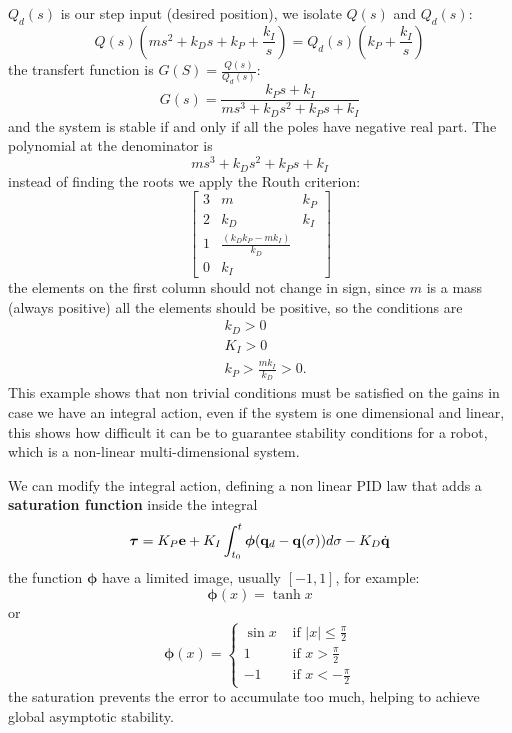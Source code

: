 \documentclass[10pt, a4paper]{report}
\newcommand{\q}{{\mathbf q}}
\begin{document}
$Q_d(s)$ is our step input (desired position), we isolate $Q(s)$ and $Q_d(s)$:\begin{equation}
    Q(s) \left( m s^2 + k_D s + k_P + \frac{k_I}{s} \right) = Q_d(s) \left( k_P + \frac{k_I}{s} \right)
\end{equation}
the transfert function is $G(S)=\frac{Q(s)}{Q_d(s)}$:\begin{equation}
    G(s) = \frac{k_Ps + k_I}{m s^3 + k_D s^2 + k_Ps + k_I}
\end{equation}
and the system is stable if and only if all the poles have negative real part. The polynomial at the denominator is \begin{equation}
   m s^3 + k_D s^2 + k_Ps + k_I
\end{equation}
instead of finding the roots we apply the Routh criterion:\begin{equation}
    \begin{bmatrix}
        3 & m & k_P\\ 
        2 & k_D & k_I \\
        1& \frac{(k_Dk_P-mk_I)}{k_D}& \\
        0&k_I& 
    \end{bmatrix}
\end{equation}
the elements on the first column should not change in sign, since $m$ is a mass (always positive) all the elements should be positive, so the conditions are\begin{align}
    &k_D>0\\ 
    &K_I>0\\
    &k_P>\frac{mk_I}{k_D}>0.
\end{align}
This example shows that non trivial conditions must be satisfied on the gains in case we have an integral action, even if the system is one dimensional and linear, this shows how difficult it can be to guarantee stability conditions for a robot, which is a non-linear multi-dimensional system.\bigskip

We can modify the integral action, defining a non linear PID law that adds a \textbf{saturation function} inside the integral\begin{equation}
     \btau=K_P\mathbf e+K_I\int_{t_0}^t\boldsymbol{\phi}(\q_d-\q(\sigma))d\sigma-K_D\dq
\end{equation}
the function $\boldsymbol{\phi}$ have a limited image, usually $[-1,1]$, for example:\begin{equation}
    \boldsymbol{\phi}(x)=\tanh x 
\end{equation}
or\begin{equation}
    \boldsymbol{\phi}(x)=\begin{cases}
        \sin x &\text{ if }|x|\le\frac{\pi}{2}\\ 
         1 &\text{ if }x>\frac{\pi}{2}\\ 
          -1 &\text{ if }x<-\frac{\pi}{2}
    \end{cases}
\end{equation}
the saturation prevents the error to accumulate too much, helping to achieve global asymptotic stability.\bigskip
\end{document}
